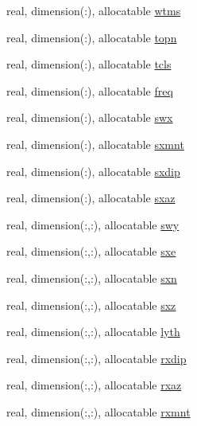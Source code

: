 \begin{DoxyCompactItemize}
\item 
real, dimension(\+:), allocatable \hyperlink{namespacemg__input__routines_acdcf9d9c5c6aa5caa0717ba290f56d75}{wtms}
\item 
real, dimension(\+:), allocatable \hyperlink{namespacemg__input__routines_a3573ee6dda5d312d3825a8a676b907b8}{topn}
\item 
real, dimension(\+:), allocatable \hyperlink{namespacemg__input__routines_ae17a0b5618d3599e2ef58e1f2227ab68}{tcls}
\item 
real, dimension(\+:), allocatable \hyperlink{namespacemg__input__routines_aed0c04ce17d1cbf624d2544819459544}{freq}
\item 
real, dimension(\+:), allocatable \hyperlink{namespacemg__input__routines_a2ec39304a790c075267ce8d0a9df5198}{swx}
\item 
real, dimension(\+:), allocatable \hyperlink{namespacemg__input__routines_ad077d55e4c73022ff46aa22100c32219}{sxmnt}
\item 
real, dimension(\+:), allocatable \hyperlink{namespacemg__input__routines_abb059525b2cbc04fed2e250e0ed7df08}{sxdip}
\item 
real, dimension(\+:), allocatable \hyperlink{namespacemg__input__routines_aa821bce738fe1604b19b8d83db934692}{sxaz}
\item 
real, dimension(\+:,\+:), allocatable \hyperlink{namespacemg__input__routines_a918ef23c1105dc44a79428e83be090c8}{swy}
\item 
real, dimension(\+:,\+:), allocatable \hyperlink{namespacemg__input__routines_af04dae3936f15389226f46ddc8c0f815}{sxe}
\item 
real, dimension(\+:,\+:), allocatable \hyperlink{namespacemg__input__routines_a767f35aedf1b84295f2130e0d4028b97}{sxn}
\item 
real, dimension(\+:,\+:), allocatable \hyperlink{namespacemg__input__routines_a35d6682fe8d7519dcfe49b65584486ae}{sxz}
\item 
real, dimension(\+:,\+:), allocatable \hyperlink{namespacemg__input__routines_aa9693c554c4256fdbbe5ed5a0bc7976f}{lyth}
\item 
real, dimension(\+:,\+:), allocatable \hyperlink{namespacemg__input__routines_aed3ac6dc57c781768202d18f3d62890b}{rxdip}
\item 
real, dimension(\+:,\+:), allocatable \hyperlink{namespacemg__input__routines_aef064a6e032db7a3d58c0d1964e517ae}{rxaz}
\item 
real, dimension(\+:,\+:), allocatable \hyperlink{namespacemg__input__routines_a7e1fc78cde53c3fba57fb6843fdd754f}{rxmnt}

\end{DoxyCompactItemize}
